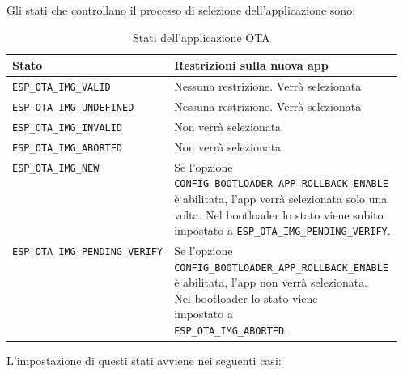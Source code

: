 \documentclass[a4paper]{article}
\begin{document}
\vspace{1em}
\noindent
Gli stati che controllano il processo di selezione dell'applicazione sono:
\begin{table}[H]
  \centering
  \begin{tabular}{|l|l|}
    \hline
    \textbf{Stato} & \textbf{Restrizioni sulla nuova app} \\
    \hline
    \texttt{ESP\_OTA\_IMG\_VALID} & Nessuna restrizione. Verrà selezionata \\
    \hline
    \texttt{ESP\_OTA\_IMG\_UNDEFINED} & Nessuna restrizione. Verrà selezionata \\
    \hline
    \texttt{ESP\_OTA\_IMG\_INVALID} & Non verrà selezionata \\
    \hline
    \texttt{ESP\_OTA\_IMG\_ABORTED} & Non verrà selezionata \\
    \hline
    \texttt{ESP\_OTA\_IMG\_NEW} & \makecell[l]{Se l'opzione \\
    \texttt{CONFIG\_BOOTLOADER\_APP\_ROLLBACK\_ENABLE} \\
    è abilitata, l'app verrà selezionata solo una \\
    volta. Nel bootloader lo stato viene subito \\
    impostato a \texttt{ESP\_OTA\_IMG\_PENDING\_VERIFY}.} \\
    \hline
      \texttt{ESP\_OTA\_IMG\_PENDING\_VERIFY} & \makecell[l]{Se l'opzione \\
    \texttt{CONFIG\_BOOTLOADER\_APP\_ROLLBACK\_ENABLE} \\
    è abilitata, l'app non verrà selezionata. \\
    Nel bootloader lo stato viene \\
    impostato a \\
    \texttt{ESP\_OTA\_IMG\_ABORTED}.} \\
    \hline
  \end{tabular}
  \caption{Stati dell'applicazione OTA}
\end{table}
\noindent
L'impostazione di questi stati avviene nei seguenti casi:
\end{document}
